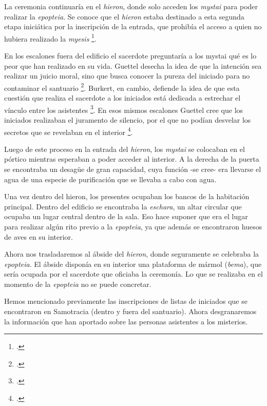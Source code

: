 La ceremonia continuaría en el \textit{hieron}, donde solo acceden los \textit{mystai} para poder realizar la \textit{epopteia}. Se conoce que el \textit{hieron} estaba destinado a esta segunda etapa iniciática por la inscripción de la entrada, que prohibía el acceso a quien no hubiera realizado la \textit{myesis} \footcite[302]{burkertReligionGriegaArcaica2007}.

En los escalones fuera del edificio el sacerdote preguntaría a los mystai qué es lo peor que han realizado en su vida. Guettel desecha la idea de que la intención sea realizar un juicio moral, sino que busca conocer la pureza del iniciado para no contaminar el santuario \footcite[32]{guettelcoleTheoiMegaloiCult1984}. Burkert, en cambio, defiende la idea de que esta cuestión que realiza el sacerdote a los iniciados está dedicada a estrechar el vínculo entre los asistentes \footcite[376]{burkertReligionGriegaArcaica2007}. En esos mismos escalones Guettel cree que los iniciados realizaban el juramento de silencio, por el que no podían desvelar los secretos que se revelaban en el interior \footcite[32]{guettelcoleTheoiMegaloiCult1984}.

Luego de este proceso en la entrada del \textit{hieron}, los \textit{mystai} se colocaban en el pórtico mientras esperaban a poder acceder al interior. A la derecha de la puerta se encontraba un desagüe de gran capacidad, cuya función -se cree- era llevarse el agua de una especie de purificación que se llevaba a cabo con agua.

Una vez dentro del hieron, los presentes ocupaban los bancos de la habitación principal. Dentro del edificio se encontraba la \textit{eschara}, un altar circular que ocupaba un lugar central dentro de la sala. Eso hace suponer que era el lugar para realizar algún rito previo a la \textit{epopteia}, ya que además se encontraron huesos de aves en su interior.

Ahora nos trasladaremos al ábside del \textit{hieron}, donde seguramente se celebraba la \textit{epopteia}. El ábside disponía en su interior una plataforma de mármol (\textit{bema}), que sería ocupada por el sacerdote que oficiaba la ceremonía. Lo que se realizaba en el momento de la \textit{epopteia} no se puede concretar.

Hemos mencionado previamente las inscripciones de listas de iniciados que se encontraron en Samotracia (dentro y fuera del santuario). Ahora desgranaremos la información que han aportado sobre las personas asistentes a los misterios. 

